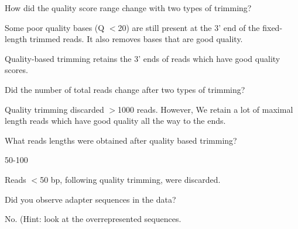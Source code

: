 \begin{questions}
How did the quality score range change with two types of trimming?
\begin{answer}
Some poor quality bases (Q $<$20) are still present at the 3' end of the
fixed-length trimmed reads. It also removes bases that are good quality.

Quality-based trimming retains the 3' ends of reads which have good quality
scores.
\end{answer}

Did the number of total reads change after two types of trimming?
\begin{answer}
Quality trimming discarded $>$1000 reads. However, We retain a lot of maximal
length reads which have good quality all the way to the ends.
\end{answer}

What reads lengths were obtained after quality based trimming?
\begin{answer}
50-100

Reads $<$50 bp, following quality trimming, were discarded.
\end{answer}

Did you observe adapter sequences in the data?
\begin{answer}
No. (Hint: look at the overrepresented sequences.
\end{answer}

\end{questions}

